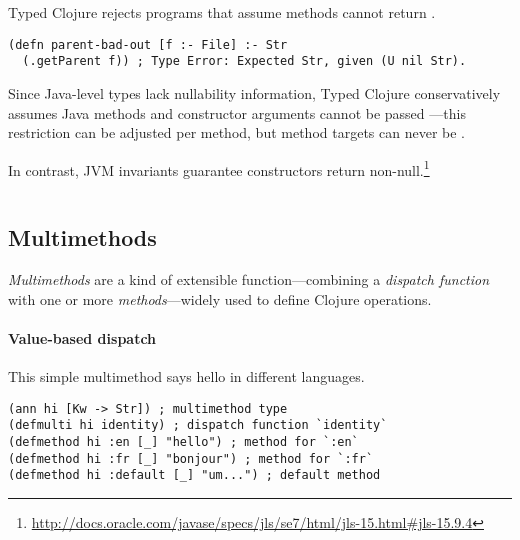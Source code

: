 Typed Clojure rejects programs that assume methods cannot return .
%
\begin{verbatim}
(defn parent-bad-out [f :- File] :- Str
  (.getParent f)) ; Type Error: Expected Str, given (U nil Str).
\end{verbatim}
Since Java-level types lack nullability information,
Typed Clojure conservatively assumes Java methods and
constructor arguments cannot be passed ---this restriction can be
adjusted per method, but method targets can never be .

%
%
%
In contrast, JVM invariants guarantee constructors return non-null.\footnote{\url{http://docs.oracle.com/javase/specs/jls/se7/html/jls-15.html#jls-15.9.4}}
%
\begin{exmp}
\inputminted[firstline=15,lastline=15]{clojure}{code/demo/src/demo/parent3.clj}
\end{exmp}


\subsection{Multimethods}

\label{sec:multioverview}

\emph{Multimethods} are a kind of extensible function---combining a \emph{dispatch function} with 
one or more \emph{methods}---widely used to define Clojure operations.

\paragraph{Value-based dispatch}
This simple multimethod says hello in different languages.%

\begin{exmp}
\begin{verbatim}
(ann hi [Kw -> Str]) ; multimethod type
(defmulti hi identity) ; dispatch function `identity`
(defmethod hi :en [_] "hello") ; method for `:en`
(defmethod hi :fr [_] "bonjour") ; method for `:fr`
(defmethod hi :default [_] "um...") ; default method
\end{verbatim}
\label{example:hi-multimethod}
\end{exmp}

